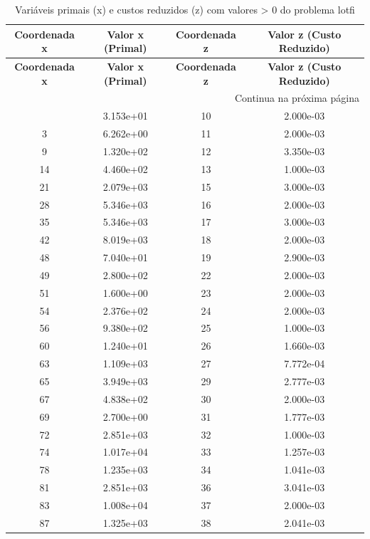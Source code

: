 \documentclass[12pt]{article}
\begin{document}
\begin{longtable}{@{}cccc@{}}
\caption{Variáveis primais (x) e custos reduzidos (z) com valores > 0 do problema lotfi} \\
\toprule
\textbf{Coordenada x} & \textbf{Valor x (Primal)} & \textbf{Coordenada z} & \textbf{Valor z (Custo Reduzido)} \\
\midrule
\endfirsthead

\toprule
\textbf{Coordenada x} & \textbf{Valor x (Primal)} & \textbf{Coordenada z} & \textbf{Valor z (Custo Reduzido)} \\
\midrule
\endhead

\midrule \multicolumn{4}{r}{{Continua na próxima página}} \\ \midrule
\endfoot

\bottomrule
\endlastfoot
1 & 3.153e+01 & 10 & 2.000e-03 \\
3 & 6.262e+00 & 11 & 2.000e-03 \\
9 & 1.320e+02 & 12 & 3.350e-03 \\
14 & 4.460e+02 & 13 & 1.000e-03 \\
21 & 2.079e+03 & 15 & 3.000e-03 \\
28 & 5.346e+03 & 16 & 2.000e-03 \\
35 & 5.346e+03 & 17 & 3.000e-03 \\
42 & 8.019e+03 & 18 & 2.000e-03 \\
48 & 7.040e+01 & 19 & 2.900e-03 \\
49 & 2.800e+02 & 22 & 2.000e-03 \\
51 & 1.600e+00 & 23 & 2.000e-03 \\
54 & 2.376e+02 & 24 & 2.000e-03 \\
56 & 9.380e+02 & 25 & 1.000e-03 \\
60 & 1.240e+01 & 26 & 1.660e-03 \\
63 & 1.109e+03 & 27 & 7.772e-04 \\
65 & 3.949e+03 & 29 & 2.777e-03 \\
67 & 4.838e+02 & 30 & 2.000e-03 \\
69 & 2.700e+00 & 31 & 1.777e-03 \\
72 & 2.851e+03 & 32 & 1.000e-03 \\
74 & 1.017e+04 & 33 & 1.257e-03 \\
78 & 1.235e+03 & 34 & 1.041e-03 \\
81 & 2.851e+03 & 36 & 3.041e-03 \\
83 & 1.008e+04 & 37 & 2.000e-03 \\
87 & 1.325e+03 & 38 & 2.041e-03 \\

\end{longtable}
\end{document}
